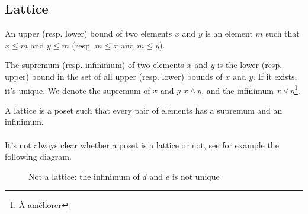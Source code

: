  \subsection{Lattice}

  \begin{definition}
    An upper (resp. lower) bound of two elements $x$ and $y$ is an element $m$ such that $x \le m$ and $y \le m$ (resp. $m \le x$ and $m \le y$).
  \end{definition}

  \begin{definition}
    The supremum (resp. infinimum) of two elements $x$ and $y$ is the lower (resp. upper) bound in the set of all upper (resp. lower) bounds of $x$ and $y$. If it exists, it's unique. We denote the supremum of $x$ and $y$ $x \wedge y$, and the infinimum $ x \vee y$\footnote{À améliorer}.
  \end{definition}

  \begin{definition}[Lattice]
    A lattice is a poset such that every pair of elements has a supremum and an infinimum.
  \end{definition}

  \paragraph{}
  It's not always clear whether a poset is a lattice or not, see for example the following diagram.

  \begin{figure}[H]
    \begin{center}
      \caption{Not a lattice: the infinimum of $d$ and $e$ is not unique}
    \end{center}
  \end{figure}
